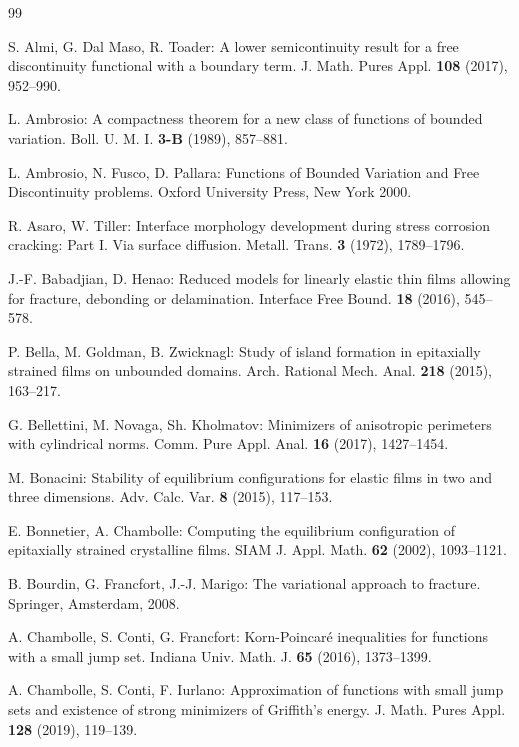 \documentclass[reqno]{amsart}
\numberwithin{equation}{section}
\theoremstyle{plain}
\theoremstyle{definition}
\begin{document}
\begin{thebibliography}{99}

 S. Almi, G. Dal Maso,  R. Toader: 
A lower semicontinuity result for a free discontinuity functional with a boundary term. J. Math. Pures Appl. {\bf 108} (2017), 952--990.

 L. Ambrosio: A compactness theorem for a new class of functions of bounded variation. Boll. U. M. I. {\bf 3-B} (1989), 857--881.

 L. Ambrosio, N. Fusco, D. Pallara:  Functions of Bounded Variation and Free Discontinuity problems. Oxford University Press, New York 2000.

 R. Asaro, W. Tiller:  Interface morphology development during stress corrosion cracking: Part I. Via surface diffusion. Metall. Trans. \textbf{3} (1972), 1789--1796.  
 
 J.-F. Babadjian, D. Henao: 
Reduced models for linearly elastic thin films allowing for fracture, debonding or delamination. Interface Free Bound.  \textbf{18} (2016), 545--578.

 P. Bella, M. Goldman, B. Zwicknagl:  
Study of island formation in epitaxially strained films on unbounded domains. Arch. Rational Mech. Anal. {\bf 218} (2015), 163--217.
 
 G. Bellettini, M. Novaga, Sh. Kholmatov:  Minimizers of anisotropic perimeters with cylindrical norms. Comm. Pure Appl. Anal. {\bf 16} (2017), 1427--1454.  
 
 M. Bonacini: Stability of equilibrium configurations for elastic films in two and three dimensions. Adv. Calc. Var. {\bf 8} (2015), 117--153.
 
 E. Bonnetier, A. Chambolle:  Computing the equilibrium configuration of epitaxially strained crystalline films.  SIAM J. Appl. Math. {\bf 62} (2002), 1093--1121.

 B. Bourdin, G. Francfort, J.-J. Marigo:  The variational approach to fracture. Springer, Amsterdam, 2008.
 
 A. Chambolle, S. Conti, G. Francfort: Korn-Poincar\'e inequalities for functions with a small jump set. Indiana Univ. Math. J. {\bf 65} (2016), 1373--1399. 

 A. Chambolle, S. Conti, F. Iurlano:  Approximation of functions with small jump sets  and existence of strong minimizers of Griffith's energy. J. Math. Pures Appl. {\bf 128} (2019), 119--139.


\end{thebibliography}
\end{document}
